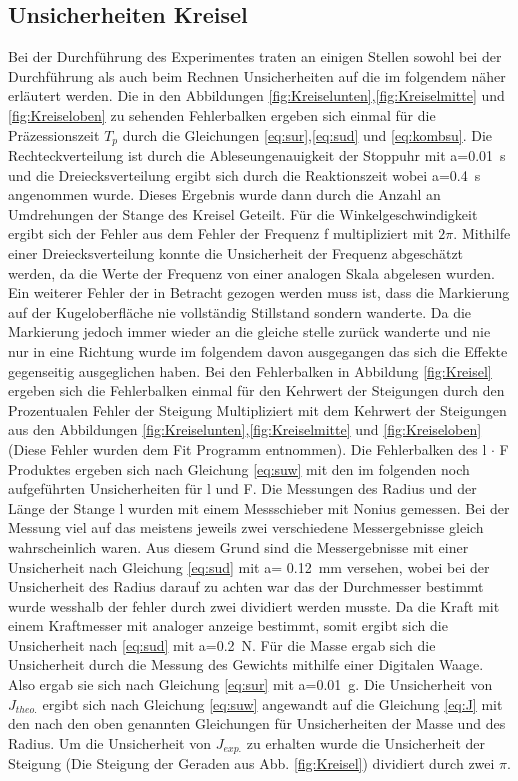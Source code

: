 \subsection{Unsicherheiten Kreisel}
Bei der Durchführung des Experimentes traten an einigen Stellen sowohl bei der Durchführung als auch beim Rechnen Unsicherheiten auf die im folgendem näher erläutert werden.
Die in den Abbildungen \ref{fig:Kreiselunten},\ref{fig:Kreiselmitte} und \ref{fig:Kreiseloben} zu sehenden Fehlerbalken ergeben sich einmal für die Präzessionszeit $T_p$ durch die Gleichungen \ref{eq:sur},\ref{eq:sud} und \ref{eq:kombsu}.
Die Rechteckverteilung ist durch die Ableseungenauigkeit der Stoppuhr mit a=\SI{0.01}{s} und die Dreiecksverteilung ergibt sich durch die Reaktionszeit wobei a=\SI{0,4}{s} angenommen wurde. Dieses Ergebnis wurde dann durch die Anzahl an Umdrehungen der Stange des Kreisel Geteilt.
Für die Winkelgeschwindigkeit ergibt sich der Fehler aus dem Fehler der Frequenz f multipliziert mit $2\pi$. Mithilfe einer Dreiecksverteilung konnte die Unsicherheit der Frequenz abgeschätzt werden, da die Werte der Frequenz von einer analogen Skala abgelesen wurden. Ein weiterer Fehler der in Betracht gezogen werden muss ist, dass die Markierung auf der Kugeloberfläche nie vollständig Stillstand sondern wanderte. Da die Markierung jedoch immer wieder an die gleiche stelle zurück wanderte und nie nur in eine Richtung wurde im folgendem davon ausgegangen das sich die Effekte gegenseitig ausgeglichen haben.
Bei den Fehlerbalken in Abbildung \ref{fig:Kreisel} ergeben sich die Fehlerbalken einmal für den Kehrwert der Steigungen durch den Prozentualen Fehler der Steigung Multipliziert mit dem Kehrwert der Steigungen aus den Abbildungen \ref{fig:Kreiselunten},\ref{fig:Kreiselmitte} und \ref{fig:Kreiseloben} (Diese Fehler wurden dem Fit Programm entnommen). 
Die Fehlerbalken des  l $\cdot$ F Produktes ergeben sich nach Gleichung \ref{eq:suw} mit den im folgenden noch aufgeführten Unsicherheiten für l und F.
Die Messungen des Radius und der Länge der Stange l wurden mit einem Messschieber mit Nonius gemessen. Bei der Messung viel auf das meistens jeweils  zwei verschiedene Messergebnisse gleich wahrscheinlich  waren. Aus diesem Grund 
sind die Messergebnisse mit einer Unsicherheit nach Gleichung \ref{eq:sud} mit a= \SI{0,12}{mm} versehen, wobei bei der Unsicherheit des Radius darauf zu achten war das der Durchmesser bestimmt wurde wesshalb der fehler durch zwei dividiert werden musste. Da die Kraft mit einem Kraftmesser mit analoger anzeige bestimmt, somit ergibt sich die Unsicherheit nach \ref{eq:sud} mit a=\SI{0,2}{N}. Für die Masse  ergab sich die Unsicherheit durch die Messung des Gewichts mithilfe einer Digitalen Waage. Also ergab sie sich nach Gleichung \ref{eq:sur} mit a=\SI{0,01}{g}. 
Die Unsicherheit von $J_{theo.}$ ergibt sich nach Gleichung \ref{eq:suw} angewandt auf die Gleichung \ref{eq:J} mit den nach den oben genannten Gleichungen für Unsicherheiten der Masse und des Radius.
Um die Unsicherheit von $J_{exp.}$ zu erhalten wurde die Unsicherheit der Steigung (Die Steigung der Geraden aus Abb. \ref{fig:Kreisel}) dividiert durch zwei $\pi$. 